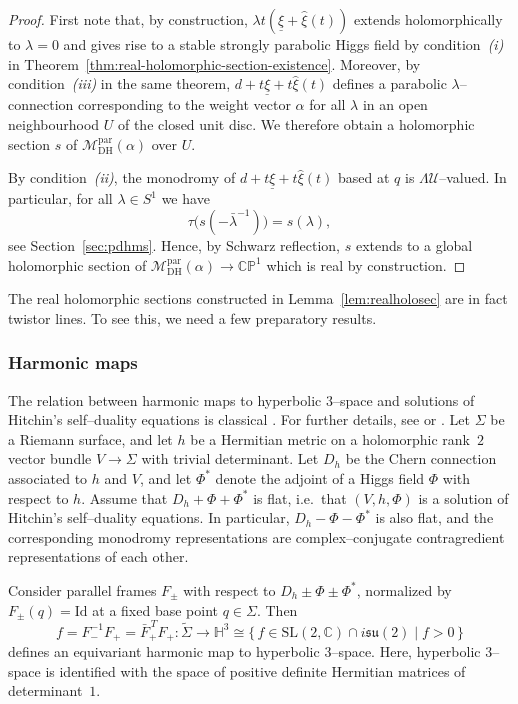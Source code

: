 \documentclass[12pt,a4paper]{amsart}
\theoremstyle{definition}
\theoremstyle{remark}
\newcommand{\C}{\mathbb C}
\newcommand{\CP}{\mathbb{CP}}
\begin{document}
\begin{proof}
First note that, by construction, $\lambda t(\underline\xi+\hat\xi(t))$ extends
holomorphically to $\lambda=0$ and gives rise to a stable strongly parabolic Higgs
field by condition~\emph{(i)} in
Theorem~\ref{thm:real-holomorphic-section-existence}.
Moreover, by condition~\emph{(iii)} in the same theorem,
$d+t\underline\xi+t\hat\xi(t)$ defines a parabolic $\lambda$--connection
corresponding to the weight vector $\alpha$ for all $\lambda$ in an open neighbourhood
$U$ of the closed unit disc.
We therefore obtain a holomorphic section $s$ of
$\mathcal M_{\mathrm{DH}}^{\mathrm{par}}(\alpha)$ over $U$.

By condition~\emph{(ii)}, the monodromy of $d+t\underline\xi+t\hat\xi(t)$ based at $q$
is $\Lambda\mathcal U$--valued.
In particular, for all $\lambda\in S^1$ we have
\[
\tau\bigl(s(-\bar\lambda^{-1})\bigr)=s(\lambda),
\]
see Section~\ref{sec:pdhms}.
Hence, by Schwarz reflection, $s$ extends to a global holomorphic section of
$\mathcal M_{\mathrm{DH}}^{\mathrm{par}}(\alpha)\to\CP^1$ which is real by construction.
\end{proof}

The real holomorphic sections constructed in Lemma~\ref{lem:realholosec} are in fact
twistor lines. To see this, we need a few preparatory results.





\subsubsection*{Harmonic maps}

The relation between harmonic maps to hyperbolic $3$--space and solutions of
Hitchin's self--duality equations is classical \cite{Donald}.
For further details, see \cite[Section~3.2]{OSWW} or \cite[Section~2.5]{BBDH}.
Let $\Sigma$ be a Riemann surface, and let $h$ be a Hermitian metric on a holomorphic
rank~$2$ vector bundle $V\to\Sigma$ with trivial determinant.
Let $D_h$ be the Chern connection associated to $h$ and $V$, and let $\Phi^*$
denote the adjoint of a Higgs field $\Phi$ with respect to $h$.
Assume that $D_h+\Phi+\Phi^*$ is flat, i.e.\ that $(V,h,\Phi)$ is a solution of
Hitchin's self--duality equations.
In particular, $D_h-\Phi-\Phi^*$ is also flat, and the corresponding monodromy
representations are complex--conjugate contragredient representations of each other.

Consider parallel frames $F_\pm$ with respect to $D_h\pm\Phi\pm\Phi^*$, normalized
by $F_\pm(q)=\mathrm{Id}$ at a fixed base point $q\in\Sigma$.
Then
\begin{equation}\label{eq:symbobenko}
f
=
F_-^{-1}F_+
=
\bar F_+^{\,T} F_+
\colon
\widetilde\Sigma\to \mathbb H^3
\cong
\{\,f\in\mathrm{SL}(2,\C)\cap i\mathfrak{su}(2)\mid f>0\,\}
\end{equation}
defines an equivariant harmonic map to hyperbolic $3$--space.
Here, hyperbolic $3$--space is identified with the space of positive definite
Hermitian matrices of determinant~$1$.
\end{document}
